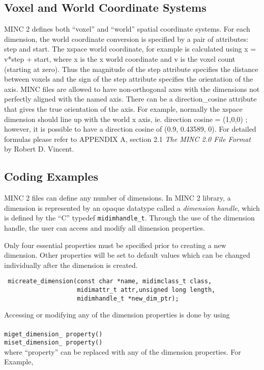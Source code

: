 \documentclass{article}
\begin{document}
\subsection{Voxel and World Coordinate Systems}
MINC 2 defines both ``voxel'' and ``world'' spatial coordinate systems.
For each dimension, the world  coordinate  conversion is specified  
by a pair of attributes: step and start. The xspace world coordinate, 
for example is calculated using x = v*step + start, where x is the x world 
coordinate and v is the voxel count (starting at zero). Thus the magnitude 
of the step attribute specifies the distance between voxels and the sign 
of the step attribute specifies the orientation of the axis. MINC files are 
allowed to have non-orthogonal axes with the dimensions not perfectly 
aligned with the named axis. There can be a direction\_cosine attribute that 
gives the true orientation of the axis. For example, normally the xspace 
dimension should line up with the world x axis, ie. direction cosine = (1,0,0)
; however, it is possible to have a direction cosine of (0.9, 0.43589, 0).
For detailed formulas please refer to APPENDIX A, section 2.1
\emph{The MINC 2.0 File Format} by Robert D. Vincent.
\subsection{Coding Examples}
MINC 2 files can define any number of dimensions. In MINC 2 library, a dimension 
is represented by an opaque datatype
called a \emph{dimension handle}, which is defined by the ``C'' typedef
{\tt midimhandle\_t}. Through the use of the dimension handle, the user can access and 
modify all dimension properties. 

Only four essential properties must be specified prior to creating a new dimension. 
Other properties will be set to default values which can be 
changed individually after the dimension is created.
\begin{verbatim}
 micreate_dimension(const char *name, midimclass_t class, 
                    midimattr_t attr,unsigned long length, 
                    midimhandle_t *new_dim_ptr);
\end{verbatim}
Accessing or modifying any of the dimension properties is done by using \\
\\
{\tt miget\_dimension\_ property() }\\
{\tt miset\_dimension\_ property() } 
\\
where ``property'' can be replaced with any of the dimension properties. 
For Example,
\end{document}
